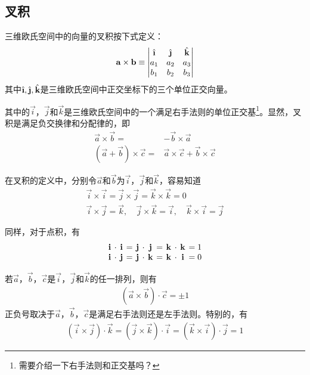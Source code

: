 \subsection{叉积}
\label{sec:cross-product-of-vector}
\begin{definition}
  三维欧氏空间中的向量的叉积按下式定义：
  \begin{align*}
    \vec{a}\times\vec{b}\equiv
    \begin{vmatrix}
      \ihat  & \jhat  & \khat\\
      a_1    & a_2    & a_3\\
      b_1    & b_2    & b_3
    \end{vmatrix}
  \end{align*}
  其中$\ihat, \jhat, \khat$是三维欧氏空间中正交坐标下的三个单位正交向量。
\end{definition}
其中的$\vec i$，$\vec j$和$\vec k$是三维欧氏空间中的一个满足右手法则的单位正交基\footnote{\color{red}需要介绍一下右手法则和正交基吗？}。显然，叉积是满足负交换律和分配律的，即
\begin{align*}
  \vec a\times \vec b ={}& - \vec b\times \vec a\\
  (\vec a + \vec b)\times \vec c ={}& \vec a\times \vec c + \vec b\times \vec c
\end{align*}

\begin{example}
  在叉积的定义中，分别令$\vec a$和$\vec b$为$\vec i$，$\vec j$和$\vec k$，容易知道
  \begin{gather*}
    \vec i \times \vec i = \vec j\times \vec j=\vec k\times \vec k = 0\\
    \vec i\times \vec j = \vec k,\quad \vec j\times \vec k = \vec i,\quad \vec k\times \vec i = \vec j
  \end{gather*}

  同样，对于点积，有
  \begin{gather*}\setlength\arraycolsep{2pt}\renewcommand*{\arraystretch}{1.0}
    \begin{array}{cccccccccccc}
      \vec i & \cdot & \vec i & = & \vec j & \cdot & \vec j & = & \vec k & \cdot & \vec k & = 1\\
      \vec i & \cdot & \vec j & = & \vec j & \cdot & \vec k & = & \vec k & \cdot & \vec i & = 0
    \end{array}
  \end{gather*}
\end{example}

\begin{theorem}若$\vec a$，$\vec b$，$\vec c$是$\vec i$，$\vec j$和$\vec k$的任一排列，则有
  \begin{align*}
    (\vec a\times \vec b)\cdot \vec c = \pm 1
  \end{align*}
  正负号取决于$\vec a$，$\vec b$，$\vec c$是满足右手法则还是左手法则。特别的，有
  \begin{align*}
    (\vec i\times \vec j)\cdot \vec k =
    (\vec j\times \vec k)\cdot \vec i =
    (\vec k\times \vec i)\cdot \vec j = 1
  \end{align*}
\end{theorem}

